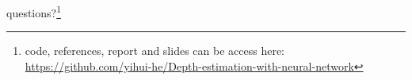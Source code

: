 \documentclass{beamer}
\begin{document}

\begin{frame}
\Huge{\centerline{questions?\footnote{code, references, report and slides can be access here:
\href{https://github.com/yihui-he/Depth-estimation-with-neural-network}{https://github.com/yihui-he/Depth-estimation-with-neural-network}}}}
\end{frame}
\end{document}
